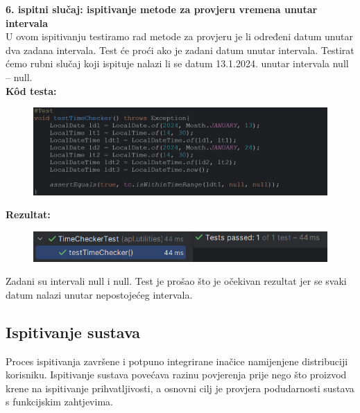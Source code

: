 \noindent \textbf{6. ispitni slučaj: ispitivanje metode za provjeru vremena unutar intervala}\\
U ovom ispitivanju testiramo rad metode za provjeru je li određeni datum unutar dva zadana intervala. Test će proći ako je zadani datum unutar intervala. Testirat ćemo rubni slučaj koji ispituje nalazi li se datum 13.1.2024. unutar intervala null – null. \\
\textbf{Kôd testa:}
\begin{figure}[H]
	\includegraphics[scale=0.5]{slike/kodTesta6.PNG} %
	\centering
\end{figure}
\noindent \textbf{Rezultat:}
\begin{figure}[H]
	\includegraphics[scale=0.6]{slike/test6.PNG} %
	\centering
\end{figure}
\noindent Zadani su intervali null i null. Test je prošao što je očekivan rezultat jer se svaki datum nalazi unutar nepostojećeg intervala.


\subsection{Ispitivanje sustava}

\noindent Proces ispitivanja završene i potpuno integrirane inačice namijenjene distribuciji korisniku. Ispitivanje sustava povećava razinu povjerenja prije nego što proizvod krene na ispitivanje prihvatljivosti, a osnovni cilj je provjera podudarnosti sustava s funkcijskim zahtjevima. \\

